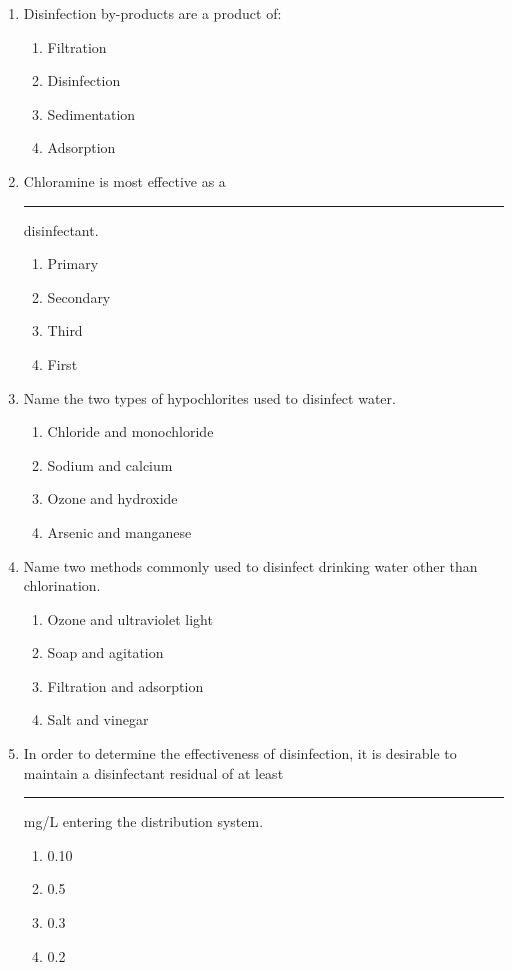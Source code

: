 \documentclass{article}
\begin{document}
\begin{enumerate}
\item Disinfection by-products are a product of:
\begin{enumerate}
\item Filtration
\item Disinfection
\item Sedimentation
\item Adsorption
\end{enumerate}

\item Chloramine is most effective as a \rule{2cm}{0.3pt} disinfectant.
\begin{enumerate}
\item Primary
\item Secondary
\item Third
\item First
\end{enumerate}

\item Name the two types of hypochlorites used to disinfect water.
\begin{enumerate}
\item Chloride and monochloride
\item Sodium and calcium
\item Ozone and hydroxide
\item Arsenic and manganese
\end{enumerate}

\item Name two methods commonly used to disinfect drinking water other than chlorination.
\begin{enumerate}
\item Ozone and ultraviolet light
\item Soap and agitation
\item Filtration and adsorption
\item Salt and vinegar
\end{enumerate}

\item In order to determine the effectiveness of disinfection, it is desirable to maintain a disinfectant residual of at least \rule{2cm}{0.3pt} mg/L entering the distribution system.
\begin{enumerate}
\item 0.10
\item 0.5
\item 0.3
\item 0.2
\end{enumerate}


\end{enumerate}
\end{document}
